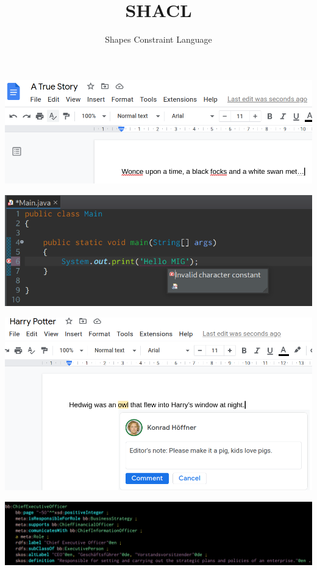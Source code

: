 \documentclass[14pt,aspectratio=1610]{beamer}
\title{SHACL}
\subtitle{Shapes Constraint Language}
\begin{document}
\begin{frame}
\titlepage
\end{frame}

\begin{frame}{}
\centering\includegraphics[width=1.05\textwidth,height=1.05\textheight,keepaspectratio]{img/spelling.png}
\end{frame}

\begin{frame}{}
\centering\includegraphics[width=1.05\textwidth,height=1.05\textheight,keepaspectratio]{img/javaerror.png}
\end{frame}

\begin{frame}{}
\centering\includegraphics[width=1.05\textwidth,height=1.05\textheight,keepaspectratio]{img/hedwig.png}
\end{frame}

\begin{frame}{}
\centering\includegraphics[width=1.05\textwidth,height=1.05\textheight,keepaspectratio]{img/bb-ceo.png}
\end{frame}
\end{document}
